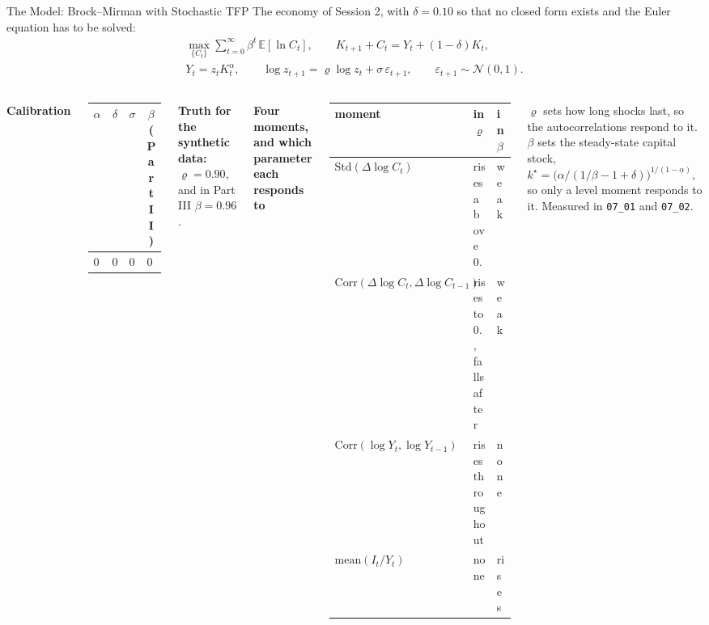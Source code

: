 \documentclass[aspectratio=169,11pt]{beamer}
\newcommand{\E}[1]{\mathbb{E}\!\left[#1\right]}
\begin{document}
\begin{frame}{The Model: Brock--Mirman with Stochastic TFP}
\footnotesize
\vspace{-0.3cm}
The economy of Session 2, with $\delta = 0.10$ so that no closed form exists and the Euler equation has to be solved:
\begin{gather*}
\max_{\{C_t\}} \sum_{t=0}^{\infty} \beta^t\, \E{\ln C_t},
\qquad K_{t+1} + C_t = Y_t + (1-\delta)K_t ,\\[4pt]
Y_t = z_t K_t^{\alpha}, \qquad
\log z_{t+1} = \varrho \log z_t + \sigma\,\varepsilon_{t+1},
\qquad \varepsilon_{t+1} \sim \mathcal{N}(0,1).
\end{gather*}

\vspace{0.1cm}
\begin{columns}[T]
\textbf{Calibration}
\begin{center}\footnotesize
\begin{tabular}{cccc}
\toprule
$\alpha$ & $\delta$ & $\sigma$ & $\beta$ (Part II) \\
\midrule
$0.36$ & $0.10$ & $0.04$ & $0.96$ \\
\bottomrule
\end{tabular}
\end{center}
\vspace{0.1cm}
\textbf{Truth for the synthetic data:} $\varrho = 0.90$, and in Part III $\beta = 0.96$.

\textbf{Four moments, and which parameter each responds to}
\begin{center}\footnotesize
\setlength{\tabcolsep}{4pt}
\begin{tabular}{lll}
\toprule
moment & in $\varrho$ & in $\beta$ \\
\midrule
$\mathrm{Std}(\Delta \log C_t)$ & rises above $0.8$ & weak \\
$\mathrm{Corr}(\Delta \log C_t, \Delta \log C_{t-1})$ & rises to $0.9$, falls after & weak \\
$\mathrm{Corr}(\log Y_t, \log Y_{t-1})$ & rises throughout & none \\
$\mathrm{mean}(I_t / Y_t)$ & none & rises \\
\bottomrule
\end{tabular}
\end{center}
{\scriptsize $\varrho$ sets how long shocks last, so the autocorrelations respond to it. $\beta$ sets the steady-state capital stock, $k^\star = \big(\alpha / (1/\beta - 1 + \delta)\big)^{1/(1-\alpha)}$, so only a level moment responds to it. Measured in \texttt{07\_01} and \texttt{07\_02}.}
\end{columns}
\end{frame}
\end{document}

